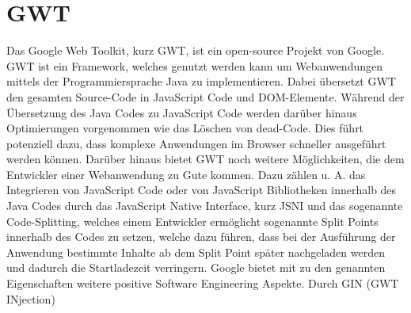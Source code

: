 \section{GWT}
\label{GWT}
Das Google Web Toolkit, kurz GWT, ist ein open-source Projekt von Google. GWT
ist ein Framework, welches genutzt werden kann um Webanwendungen mittels der
Programmiersprache Java zu implementieren. Dabei übersetzt GWT den gesamten
Source-Code in JavaScript Code und DOM-Elemente. Während der Übersetzung des
Java Codes zu JavaScript Code werden darüber hinaus Optimierungen vorgenommen
wie das Löschen von dead-Code. Dies führt potenziell dazu, dass komplexe
Anwendungen im Browser schneller ausgeführt werden können. Darüber hinaus bietet
GWT noch weitere Möglichkeiten, die dem Entwickler einer Webanwendung zu Gute
kommen. Dazu zählen u. A. das Integrieren von JavaScript Code oder von
JavaScript Bibliotheken innerhalb des Java Codes durch das JavaScript Native
Interface, kurz JSNI und das sogenannte Code-Splitting, welches einem Entwickler
ermöglicht sogenannte Split Points innerhalb des Codes zu setzen, welche dazu
führen, dass bei der Ausführung der Anwendung bestimmte Inhalte ab dem Split
Point später nachgeladen werden und dadurch die Startladezeit verringern.
Google bietet mit zu den genannten Eigenschaften weitere positive
Software Engineering Aspekte. Durch GIN (GWT INjection) 
